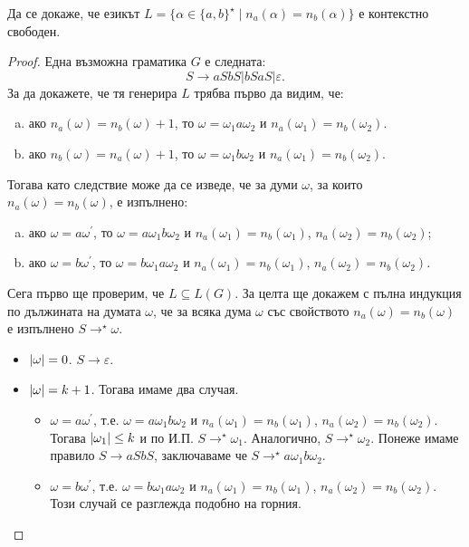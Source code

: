 \begin{problem}
  Да се докаже, че езикът $L = \{\alpha \in \{a,b\}^\star\mid n_a(\alpha) = n_b(\alpha)\}$ 
  е контекстно свободен.
\end{problem}
\begin{proof}
  Една възможна граматика $G$ е следната: 
  \[S \rightarrow aSbS\vert bSaS \vert\varepsilon.\]
  За да докажете, че тя генерира $L$ трябва първо да видим, че:
  \begin{enumerate}[a)]
  \item 
    ако $n_a(\omega) = n_b(\omega) + 1$, то
    $\omega = \omega_1 a \omega_2$ и $n_a(\omega_1) = n_b(\omega_2)$.
  \item
    ако $n_b(\omega) = n_a(\omega) + 1$, то
    $\omega = \omega_1 b \omega_2$ и $n_a(\omega_1) = n_b(\omega_2)$.
  \end{enumerate}
  Тогава като следствие може да се изведе, че за думи $\omega$, за които $n_a(\omega) = n_b(\omega)$,
  е изпълнено:
  \begin{enumerate}[a)]
  \item 
    ако $\omega = a\omega^\prime$, то
    $\omega = a\omega_1b\omega_2$ и $n_a(\omega_1) = n_b(\omega_1)$, $n_a(\omega_2) = n_b(\omega_2)$;
  \item
    ако $\omega = b\omega^\prime$, то
    $\omega = b\omega_1a\omega_2$ и $n_a(\omega_1) = n_b(\omega_1)$, $n_a(\omega_2) = n_b(\omega_2)$.
  \end{enumerate}

  Сега първо ще проверим, че $L \subseteq L(G)$.
  За целта ще докажем с пълна индукция по дължината на думата $\omega$, че за всяка дума $\omega$ със свойството $n_a(\omega) = n_b(\omega)$ е изпълнено
  $S \rightarrow^\star \omega$.
  \begin{itemize}
  \item 
    $\vert{\omega}\vert = 0$. $S \rightarrow \varepsilon$.
  \item
    $\vert{\omega}\vert = k+1$. Тогава имаме два случая.
    \begin{itemize}
    \item 
      $\omega = a\omega^\prime$, т.е. $\omega = a\omega_1b\omega_2$ и $n_a(\omega_1) = n_b(\omega_1)$, $n_a(\omega_2) = n_b(\omega_2)$.
      Тогава $\vert{\omega_1}\vert \leq k$ и по И.П. $S \rightarrow^\star \omega_1$.
      Аналогично, $S \rightarrow^\star \omega_2$.
      Понеже имаме правило $S \rightarrow aSbS$, заключаваме че $S \rightarrow^\star a\omega_1b\omega_2$.
    \item
      $\omega = b\omega^\prime$, т.е. $\omega = b\omega_1a\omega_2$ и $n_a(\omega_1) = n_b(\omega_1)$, $n_a(\omega_2) = n_b(\omega_2)$.
      Този случай се разглежда подобно на горния.
    \end{itemize}
  \end{itemize}
  

\end{proof}
